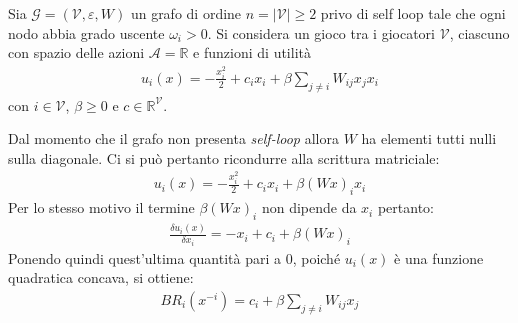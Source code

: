 \documentclass[11pt,largemargins]{homework}
\begin{document}
\section{} %
Sia  \(\mathcal{G}=(\mathcal{V}, \varepsilon, W)\) un grafo di ordine \(n = | \mathcal{V}| \geq 2\) privo di self loop tale che ogni nodo abbia grado uscente \(\omega_i > 0\). Si considera un gioco tra i giocatori \(\mathcal{V}\), ciascuno con spazio delle azioni \(\mathcal{A} = \mathbb{R}\) e funzioni di utilità
\begin{gather*}
  u_i(x)=- \frac{x_i^2}{2}+ c_i x_i + \beta \sum\limits_{j \neq i} W_{ij}x_j x_i 
\end{gather*} 
con \(i \in \mathcal{V} \), \(\beta \geq 0\) e \(c \in \mathbb{R}^{\mathcal{V}}\).
\begin{alphaparts}
  \questionpart %
  Dal momento che  il grafo non presenta \textit{self-loop} allora \(W\) ha elementi tutti nulli sulla diagonale. Ci si può pertanto ricondurre alla scrittura matriciale:
  \begin{gather*}
    u_i(x)=- \frac{x_i^2}{2}+ c_i x_i + \beta ( Wx )_i x_i
  \end{gather*}
  Per lo stesso motivo il termine \(\beta(Wx)_i\) non dipende da \(x_i\) pertanto:
  \begin{gather}
    \frac{\delta u_i ( x )}{\delta x_i} = -x_i + c_i + \beta (Wx)_i
  \end{gather} \label{eq:1}
  Ponendo quindi quest'ultima quantità pari a 0, poiché \(u_i(x)\) è una funzione quadratica concava, si ottiene:
  \begin{gather*}
    BR_i(x^{-i}) = c_i + \beta  \sum \limits_{j \neq i}^{} W_{ij}x_j 
  \end{gather*}


\end{alphaparts}
\end{document}
